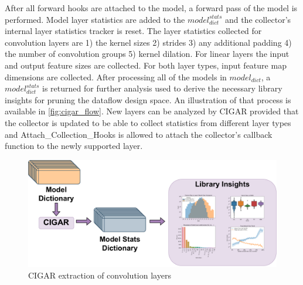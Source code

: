 After all forward hooks are attached to the model, a forward pass of the model
is performed. Model layer statistics are added to the $model^{stats}_{dict}$ and
the collector's internal layer statistics tracker is reset. The layer statistics
collected for convolution layers are 1) the kernel sizes 2) strides 3) any additional padding
4) the number of convolution groups 5) kernel dilation. For linear layers the input and output feature sizes are collected.
For both layer types, input feature map dimensions are collected. 
After processing all of the models in $model_{dict}$, a $model^{stats}_{dict}$ is
returned for further analysis used to derive the necessary library insights for
pruning the dataflow design space. An illustration of that process is available
in \autoref{fig:cigar_flow}. New layers can be analyzed by CIGAR provided that the
collector is updated to be able to collect statistics from different layer types
and Attach\_Collection\_Hooks is allowed to attach the collector's callback
function to the newly supported layer. 

\begin{figure}
    \centering
    \includegraphics[scale=0.4]{fig/Cigar_flow.pdf}
    \caption{\ac{CIGAR} extraction of convolution layers}
    \label{fig:cigar_flow}
\end{figure}

